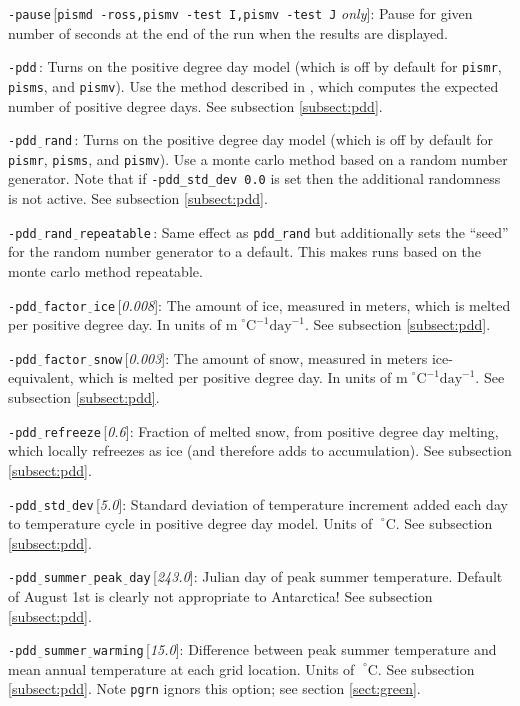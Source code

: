 \documentclass[11pt,final]{amsart}
\newcommand{\rawopt}[1]{\vspace{1mm}\noindent \large\texttt{-#1}\normalsize}
\newcommand{\opt}[1]{\rawopt{#1}\,:\quad}
\newcommand{\optdef}[2]{\rawopt{#1}\,[\textsl{#2}]:\quad}
\newcommand{\optrestrict}[2]{\rawopt{#1}\,[\texttt{#2} \textsl{only}]:\quad}
\newcommand{\und}{$\underline{\,\,\,}$}
\begin{document}
\optrestrict{pause}{pismd -ross,pismv -test I,pismv -test J}    Pause for given number of seconds at the end of the run when the results are displayed.

\opt{pdd}  Turns on the positive degree day model (which is off by default for \verb|pismr|, \verb|pisms|, and \verb|pismv|).  Use the method described in \cite{CalovGreve05}, which computes the expected number of positive degree days.  See subsection \ref{subsect:pdd}.

\opt{pdd\und rand}  Turns on the positive degree day model (which is off by default for \verb|pismr|, \verb|pisms|, and \verb|pismv|).  Use a monte carlo method based on a random number generator.  Note that if \verb|-pdd_std_dev 0.0| is set then the additional randomness is not active.  See subsection \ref{subsect:pdd}.

\opt{pdd\und rand\und repeatable}  Same effect as \verb|pdd_rand| but additionally sets the ``seed'' for the random number generator to a default.  This makes runs based on the monte carlo method repeatable.

\optdef{pdd\und factor\und ice}{0.008}  The amount of ice, measured in meters, which is melted per positive degree day.  In units of $\text{m}\!\phantom{|}^\circ\text{C}^{-1}\text{day}^{-1}$.  See subsection \ref{subsect:pdd}.

\optdef{pdd\und factor\und snow}{0.003}  The amount of snow, measured in meters ice-equivalent, which is melted per positive degree day.  In units of $\text{m}\phantom{|}^\circ\text{C}^{-1}\text{day}^{-1}$.  See subsection \ref{subsect:pdd}.

\optdef{pdd\und refreeze}{0.6}  Fraction of melted snow, from positive degree day melting, which locally refreezes as ice (and therefore adds to accumulation).  See subsection \ref{subsect:pdd}.

\optdef{pdd\und std\und dev}{5.0}  Standard deviation of temperature increment added each day to temperature cycle in positive degree day model.  Units of $\phantom{|}^\circ\text{C}$.  See subsection \ref{subsect:pdd}.

\optdef{pdd\und summer\und peak\und day}{243.0}  Julian day of peak summer temperature.  Default of August 1st is clearly not appropriate to Antarctica!  See subsection \ref{subsect:pdd}.

\optdef{pdd\und summer\und warming}{15.0}  Difference between peak summer temperature and mean annual temperature at each grid location.  Units of $\phantom{|}^\circ\text{C}$.  See subsection \ref{subsect:pdd}.  Note \verb|pgrn| ignors this option; see section \ref{sect:green}.
\end{document}

